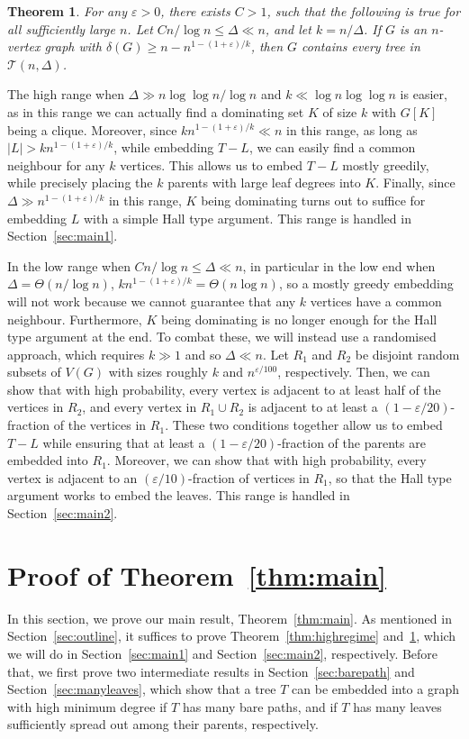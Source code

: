 \documentclass{article}
\theoremstyle{plain}
\newtheorem{theorem}{Theorem}[section]
\theoremstyle{definition}
\numberwithin{equation}{section}
\def\eps{\varepsilon}
\newcommand\cT{\mathcal{T}}
\begin{document}
\begin{theorem}\label{thm:lowregime}
For any $\eps>0$, there exists $C>1$, such that the following is true for all sufficiently large $n$. Let $Cn/\log n\leq\Delta\ll n$, and let $k=n/\Delta$. If $G$ is an $n$-vertex graph with $\delta(G)\geq n-n^{1-(1+\eps)/k}$, then $G$ contains every tree in $\cT(n,\Delta)$.
\end{theorem}

The high range when $\Delta\gg n\log\log n/\log n$ and $k\ll\log n\log\log n$ is easier, as in this range we can actually find a dominating set $K$ of size $k$ with $G[K]$ being a clique. Moreover, since $kn^{1-(1+\eps)/k}\ll n$ in this range, as long as $|L|>kn^{1-(1+\eps)/k}$, while embedding $T-L$, we can easily find a common neighbour for any $k$ vertices. This allows us to embed $T-L$ mostly greedily, while precisely placing the $k$ parents with large leaf degrees into $K$. Finally, since $\Delta\gg n^{1-(1+\eps)/k}$ in this range, $K$ being dominating turns out to suffice for embedding $L$ with a simple Hall type argument. This range is handled in Section~\ref{sec:main1}.

In the low range when $Cn/\log n\leq\Delta\ll n$, in particular in the low end when $\Delta=\Theta(n/\log n)$, $kn^{1-(1+\eps)/k}=\Theta(n\log n)$, so a mostly greedy embedding will not work because we cannot guarantee that any $k$ vertices have a common neighbour. Furthermore, $K$ being dominating is no longer enough for the Hall type argument at the end. To combat these, we will instead use a randomised approach, which requires $k\gg1$ and so $\Delta\ll n$. Let $R_1$ and $R_2$ be disjoint random subsets of $V(G)$ with sizes roughly $k$ and $n^{\eps/100}$, respectively. Then, we can show that with high probability, every vertex is adjacent to at least half of the vertices in $R_2$, and every vertex in $R_1\cup R_2$ is adjacent to at least a $(1-\eps/20)$-fraction of the vertices in $R_1$. These two conditions together allow us to embed $T-L$ while ensuring that at least a $(1-\eps/20)$-fraction of the parents are embedded into $R_1$. Moreover, we can show that with high probability, every vertex is adjacent to an $(\eps/10)$-fraction of vertices in $R_1$, so that the Hall type argument works to embed the leaves. This range is handled in Section~\ref{sec:main2}.



\section{Proof of Theorem~\ref{thm:main}}\label{sec:main}
In this section, we prove our main result, Theorem~\ref{thm:main}. As mentioned in Section~\ref{sec:outline}, it suffices to prove Theorem~\ref{thm:highregime} and~\ref{thm:lowregime}, which we will do in Section~\ref{sec:main1} and Section~\ref{sec:main2}, respectively. Before that, we first prove two intermediate results in Section~\ref{sec:barepath} and Section~\ref{sec:manyleaves}, which show that a tree $T$ can be embedded into a graph with high minimum degree if $T$ has many bare paths, and if $T$ has many leaves sufficiently spread out among their parents, respectively.
\end{document}
